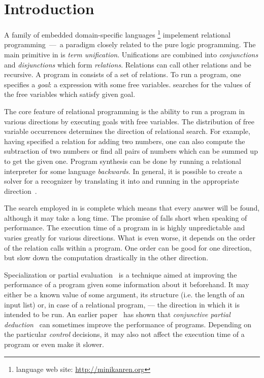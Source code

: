 \section{Introduction}

A family of embedded domain-specific languages \mk\footnote{\mk language web site: \url{http://minikanren.org}} impelement relational programming~---~a paradigm closely related to the pure logic programming.
The main primitive in \mk is \emph{term unification}.
Unifications are combined into \emph{conjunctions} and \emph{disjunctions} which form \emph{relations}.
Relations can call other relations and be recursive.
A program in \mk consists of a set of relations.
To run a \mk program, one specifies a \emph{goal}: a \mk expression with some free variables.
\mk searches for the values of the free variables which satisfy given goal.

The core feature of relational programming is the ability to run a program in various directions by executing goals with free variables.
The distribution of free variable occurrences determines the direction of relational search.
For example, having specified a relation for adding two numbers, one can also compute the subtraction of two numbers or find all pairs of numbers which can be summed up to get the given one.
Program synthesis can be done by running a relational interpreter for some language \emph{backwards}.
In general, it is possible to create a solver for a recognizer by translating it into \mk and running in the appropriate direction~\cite{lozov2019relational}.

The search employed in \mk is complete which means that every answer will be found, although it may take a long time.
The promise of \mk falls short when speaking of performance.
The execution time of a program in \mk is highly unpredictable and varies greatly for various directions.
What is even worse, it depends on the order of the relation calls within a program.
One order can be good for one direction, but slow down the computation drastically in the other direction.

Specialization or partial evaluation~\cite{jonesbook} is a technique aimed at improving the performance of a program given some information about it beforehand.
It may either be a known value of some argument, its structure (i.e. the length of an input list) or, in case of a relational program, --- the direction in which it is intended to be run.
An earlier paper~\cite{lozov2019relational} has shown that \emph{conjunctive partial deduction}~\cite{de1999conjunctive} can sometimes improve the performance of \mk programs.
Depending on the particular \emph{control} decisions, it may also not affect the execution time of a program or even make it slower.

